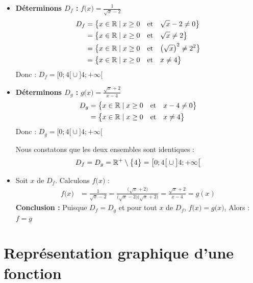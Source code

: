 \documentclass[10pt, a4paper]{article}
\begin{document}
\begin{Solution}[APPLICATION][2]
\begin{itemize}[leftmargin=*,itemsep=0.5pt]
    \item \textbf{Déterminons $D_f$ :}
     $f\big( x \big) = \frac{1}{\sqrt{x}-2}$
     \begin{align*}
        D_f &= \big\{ x \in \mathbb{R} \mid  x \geq 0 \quad \text{et} \quad \sqrt{x} - 2 \neq 0  \big\} \\
         &= \big\{ x \in \mathbb{R} \mid  x \geq 0 \quad \text{et} \quad \sqrt{x}\neq 2  \big\} \\
         &= \big\{ x \in \mathbb{R} \mid  x \geq 0 \quad \text{et} \quad \big( \sqrt{x} \big)^2 \neq 2^2  \big\} \\
         &= \big\{ x \in \mathbb{R} \mid  x \geq 0 \quad \text{et} \quad x \neq 4  \big\}
    \end{align*}
     Donc : \quad $D_f = \big[ 0 ; 4 \big[ \cup \big] 4 ; +\infty \big[$

    \item \textbf{Déterminons $D_g$ :}
     $g\big( x \big) = \frac{\sqrt{x}+2}{x-4}$
    \begin{align*}
        D_g &= \big\{ x \in \mathbb{R} \mid  x \geq 0 \quad \text{et} \quad x - 4 \neq 0 \big\} \\
         &= \big\{ x \in \mathbb{R} \mid  x \geq 0 \quad \text{et} \quad x \neq 4 \big\}
    \end{align*}
  Donc : \quad   $D_g = \big[ 0 ; 4 \big[ \cup \big] 4 ; +\infty \big[ $
 
   Nous constatons que les deux ensembles sont identiques :
\[ D_f = D_g = \mathbb{R}^+ \setminus \big\{ 4 \big\} = \big[ 0 ; 4 \big[ \cup \big] 4 ; +\infty \big[ \]

\item Soit $x$ de $D_f$. Calculons $f\big( x \big)$ :
\begin{align*}
    f\big( x \big) &= \frac{1}{\sqrt{x}-2}
    = \frac{\big( \sqrt{x} + 2 \big)}{\big( \sqrt{x} - 2 \big)\big( \sqrt{x} + 2 \big)} = \frac{\sqrt{x} + 2}{x - 4} =g(x)
\end{align*}
\textbf{Conclusion :}
Puisque $D_f = D_g$ et pour tout $x$ de $D_f$, $f\big( x \big) = g\big( x \big)$, Alors  :
    $f = g$
\end{itemize}
\end{Solution}

\section{Représentation graphique d'une fonction }
\end{document}
